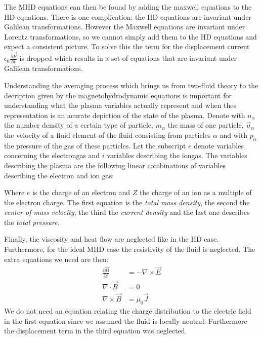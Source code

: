 The MHD equations can then be found by adding the maxwell equations to the HD equations. There is one complication: the HD equations are invariant under Galilean transformations. 
However the Maxwell equations are invariant under Lorentz transformations, so we cannot simply add them to the HD equations and expect a consistent picture.
To solve this the term for the displacement current $\epsilon_0 \frac{\partial \vec{E}}{\partial t}$ is dropped  which results in a set of equations that are invariant under Galilean transformations.

Understanding the averaging process which brings us from two-fluid theory to the decription given by the magnetohydrodynamic equations is important for understanding what the plasma variables actually represent and when thes representation is an acurate depiction of the state of the plasma.
Denote with $n_\alpha$ the number density of a certain type of particle, $m_\alpha$ the mass of one particle, $\vec{u}_\alpha$ the velocity of a fluid element of the fluid consisting from particles $\alpha$ and with $p_\alpha$ the pressure of the gas of these particles. 
Let the subscript $e$ denote variables concerning the electrongas and $i$ variables describing the iongas.
The variables describing the plasma are the following linear combinations of variables describing the electron and ion gas:

{\centering 
\noindent {}
\par}

Where $e$ is the charge of an electron and $Z$ the charge of an ion as a multiple of the electron charge. The first equation is the \emph{total mass density}, the second the \emph{center of mass velocity}, the third the \emph{current density} and the last one describes the \emph{total pressure}.

Finally, the viscosity and heat flow are neglected like in the HD case. Furthermore, for the ideal MHD case the resistivity of the fluid is neglected. The extra equations we need are then:
\begin{align*}
	\frac{\partial \vec{B}}{\partial t} &= - \nabla \times \vec{E}\\
	\nabla \cdot \vec{B} &= 0\\
	\nabla \times \vec{B} &= \mu_0 \vec{J}
\end{align*}
We do not need an equation relating the charge distribution to the electric field in the first equation since we assumed the fluid is locally neutral.
Furthermore the displacement term in the third equation was neglected.

